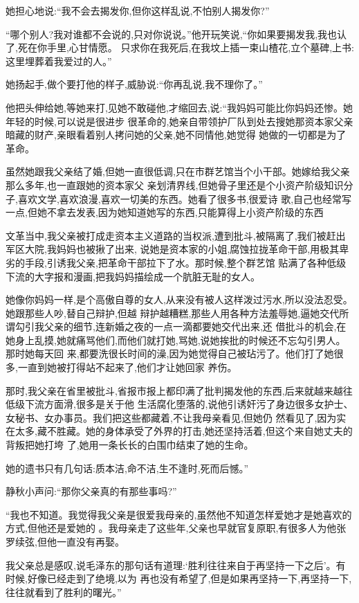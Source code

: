 ﻿\documentclass[12pt]{article}
\begin{document}
她担心地说:``我不会去揭发你,但你这样乱说,不怕别人揭发你?''

``哪个别人?我对谁都不会说的,只对你说说。''他开玩笑说,``你如果要揭发我,我也认了,死在你手里,心甘情愿。
只求你在我死后,在我坟上插一束山楂花,立个墓碑,上书:这里埋葬着我爱过的人。''

她扬起手,做个要打他的样子,威胁说:``你再乱说,我不理你了。''

他把头伸给她,等她来打,见她不敢碰他,才缩回去,说:``我妈妈可能比你妈妈还惨。她年轻的时候,可以说是很进步
很革命的,她亲自带领护厂队到处去搜她那资本家父亲暗藏的财产,亲眼看着别人拷问她的父亲,她不同情他,她觉得
她做的一切都是为了革命。

虽然她跟我父亲结了婚,但她一直很低调,只在市群艺馆当个小干部。她嫁给我父亲那么多年,也一直跟她的资本家父
亲划清界线,但她骨子里还是个小资产阶级知识分子,喜欢文学,喜欢浪漫,喜欢一切美的东西。她看了很多书,很爱诗
歌,自己也经常写一点,但她不拿去发表,因为她知道她写的东西,只能算得上小资产阶级的东西\myrule 

文革当中,我父亲被打成走资本主义道路的当权派,遭到批斗,被隔离了,我们被赶出军区大院,我妈妈也被揪了出来,
说她是资本家的小姐,腐蚀拉拢革命干部,用极其卑劣的手段,引诱我父亲,把革命干部拉下了水。那时候,整个群艺馆
贴满了各种低级下流的大字报和漫画,把我妈妈描绘成一个肮脏无耻的女人。

她像你妈妈一样,是个高傲自尊的女人,从来没有被人这样泼过污水,所以没法忍受。她跟那些人吵,替自己辩护,但越
辩护越糟糕,那些人用各种方法羞辱她,逼她交代所谓勾引我父亲的细节,连新婚之夜的一点一滴都要她交代出来,还
借批斗的机会,在她身上乱摸,她就痛骂他们,而他们就打她,骂她,说她挨批的时候还不忘勾引男人。那时她每天回
来,都要洗很长时间的澡,因为她觉得自己被玷污了。他们打了她很多,一直到她被打得站不起来了,他们才让她回家
养伤。

那时,我父亲在省里被批斗,省报市报上都印满了批判揭发他的东西,后来就越来越往低级下流方面滑,很多是关于他
生活腐化堕落的,说他引诱奸污了身边很多女护士、女秘书、女办事员。我们把这些都藏着,不让我母亲看见,但她仍
然看见了,因为实在太多,藏不胜藏。她的身体承受了外界的打击,她还坚持活着,但这个来自她丈夫的背叛把她打垮
了,她用一条长长的白围巾结束了她的生命。

她的遗书只有几句话:质本洁,命不洁,生不逢时,死而后憾。''

静秋小声问:``那你父亲真的\myrule 有那些事吗?''

``我也不知道。我觉得我父亲是很爱我母亲的,虽然他不知道怎样爱她才是她喜欢的方式,但他还是爱她的\myrule 
。我母亲走了这些年,父亲也早就官复原职,有很多人为他张罗续弦,但他一直没有\myrule 再娶。

我父亲总是感叹,说毛泽东的那句话有道理:`胜利往往来自于再坚持一下之后'。有时候,好像已经走到了绝境,以为
再也没有希望了,但是如果再坚持一下,再坚持一下,往往就看到了胜利的曙光。''
\end{document}
